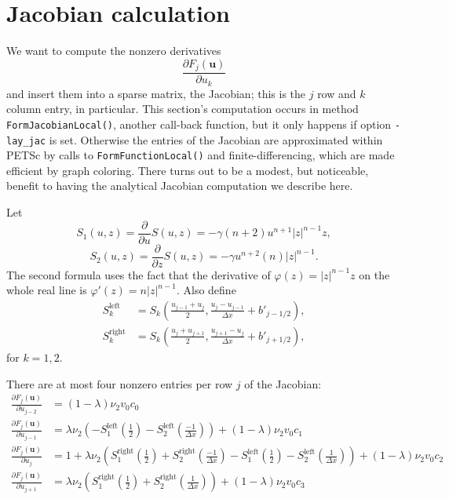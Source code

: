 \documentclass[11pt]{amsart}
\newcommand\bu{\mathbf{u}}
\begin{document}
\section{Jacobian calculation}

We want to compute the nonzero derivatives
   $$\frac{\partial F_j(\bu)}{\partial u_k}$$
and insert them into a sparse matrix, the Jacobian; this is the $j$ row and $k$ column entry, in particular.  This section's computation occurs in method \verb|FormJacobianLocal()|, another call-back function, but it only happens if option \verb|-lay_jac| is set.  Otherwise the entries of the Jacobian are approximated within PETSc by calls to \verb|FormFunctionLocal()| and finite-differencing, which are made efficient by graph coloring.  There turns out to be a modest, but noticeable, benefit to having the analytical Jacobian computation we describe here.

Let
	$$S_1(u,z) = \frac{\partial}{\partial u} S(u,z) = - \gamma (n+2) u^{n+1} |z|^{n-1} z,$$
	$$S_2(u,z) = \frac{\partial}{\partial z} S(u,z) = - \gamma u^{n+2} (n) |z|^{n-1}.$$
The second formula uses the fact that the derivative of $\varphi(z) = |z|^{n-1} z$ on the whole real line is $\varphi'(z) = n |z|^{n-1}$.  Also define
\begin{align*}
S_k^{\text{left}} &= S_k\left(\frac{u_{j-1}+u_j}{2},\frac{u_j-u_{j-1}}{\Delta x} + b'_{j-1/2}\right), \\
S_k^{\text{right}} &= S_k\left(\frac{u_j+u_{j+1}}{2},\frac{u_{j+1}-u_j}{\Delta x} + b'_{j+1/2}\right),
\end{align*}
for $k=1,2$.

There are at most four nonzero entries per row $j$ of the Jacobian:
\begin{align*}
\frac{\partial F_j(\bu)}{\partial u_{j-2}} &= (1-\lambda) \nu_2 v_0 c_0 \\
\frac{\partial F_j(\bu)}{\partial u_{j-1}} &= \lambda \nu_2 \left( - S_1^{\text{left}} (\tfrac{1}{2}) - S_2^{\text{left}} (\tfrac{-1}{\Delta x}) \right) + (1-\lambda) \nu_2 v_0 c_1 \\
\frac{\partial F_j(\bu)}{\partial u_j} &= 1 + \lambda \nu_2 \left( S_1^{\text{right}} (\tfrac{1}{2}) + S_2^{\text{right}} (\tfrac{-1}{\Delta x}) - S_1^{\text{left}} (\tfrac{1}{2}) - S_2^{\text{left}} (\tfrac{1}{\Delta x}) \right) + (1-\lambda) \nu_2 v_0 c_2 \\
\frac{\partial F_j(\bu)}{\partial u_{j+1}} &= \lambda \nu_2 \left( S_1^{\text{right}} (\tfrac{1}{2}) + S_2^{\text{right}} (\tfrac{1}{\Delta x}) \right) + (1-\lambda) \nu_2 v_0 c_3
\end{align*}



%
%
\end{document}
